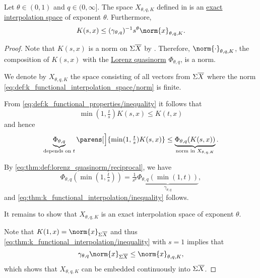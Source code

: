 \begin{theorem}\label{thm:k_functional_interpolation}
  Let \( \theta \in (0, 1) \) and \( q \in (0, \infty] \). The space \( X_{\theta,q,K} \) defined in  is an \hyperref[def:banach_interpolation_space_exponent]{exact interpolation space} of exponent \( \theta \). Furthermore,
  \begin{equation}\label{eq:thm:k_functional_interpolation/inequality}
    K(s, x) \leq (\gamma_{\theta,q})^{-1} s^\theta \norm{x}_{\theta,q,K}.
  \end{equation}
\end{theorem}
\begin{proof}
  Note that \( K(s, x) \) is a norm on \( \Sigma \oline{X} \) by . Therefore, \( \norm{\cdot}_{\theta,q,K} \), the composition of \( K(s, x) \) with the \hyperref[def:lorenz_quasinorm]{Lorenz quasinorm} \( \Phi_{\theta,q} \), is a norm.

  We denote by \( X_{\theta,q,K} \) the space consisting of all vectors from \( \Sigma \oline{X} \) where the norm \eqref{eq:def:k_functional_interpolation_space/norm} is finite.

  From \eqref{eq:def:k_functional_properties/inequality} it follows that
  \begin{equation*}
    \min(1, \tfrac t s) K(s, x) \leq K(t, x)
  \end{equation*}
  and hence
  \begin{equation*}
    \underbrace{\Phi_{\theta,q}}_{\text{depends on } t} \parens[\Big]{ \min(1, \tfrac t s) K(s, x) } \leq \underbrace{\Phi_{\theta,q}(K(s, x))}_{\text{norm in } X_{\theta,q,K}}.
  \end{equation*}

  By \eqref{eq:thm:def:lorenz_quasinorm/reciprocal}, we have
  \begin{equation*}
    \Phi_{\theta,q}(\min(1, \tfrac t s)) = \tfrac 1 {s^\theta} \underbrace{\Phi_{\theta,q}(\min(1, t))}_{\hyperref[eq:def:lorenz_quasinorm/gamma]{\gamma_{\theta,q}}},
  \end{equation*}
  and \eqref{eq:thm:k_functional_interpolation/inequality} follows.

  It remains to show that \( X_{\theta,q,K} \) is an exact interpolation space of exponent \( \theta \).

  Note that \( K(1, x) = \norm{x}_{\Sigma \oline{X}} \) and thus \eqref{eq:thm:k_functional_interpolation/inequality} with \( s = 1 \) implies that
  \begin{equation*}
    \gamma_{\theta,q} \norm{x}_{\Sigma \oline{X}} \leq \norm{x}_{\theta,q,K},
  \end{equation*}
  which shows that \( X_{\theta,q,K} \) can be embedded continuously into \( \Sigma \oline{X} \).


\end{proof}

